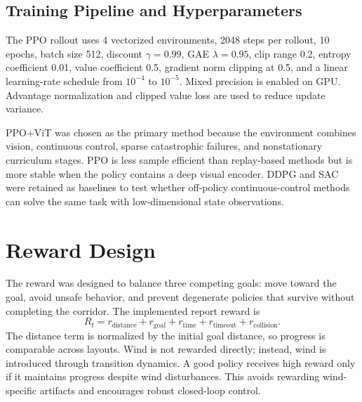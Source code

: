 \documentclass[twocolumn,a4paper,10pt]{article}
\begin{document}
\subsection{Training Pipeline and Hyperparameters}

The PPO rollout uses 4 vectorized environments, 2048 steps per rollout,
10 epochs, batch size 512, discount $\gamma=0.99$, GAE $\lambda=0.95$,
clip range 0.2, entropy coefficient 0.01, value coefficient 0.5, gradient
norm clipping at 0.5, and a linear learning-rate schedule from $10^{-4}$ to
$10^{-5}$.  Mixed precision is enabled on GPU.  Advantage normalization and
clipped value loss are used to reduce update variance.

PPO+ViT was chosen as the primary method because the environment combines
vision, continuous control, sparse catastrophic failures, and nonstationary
curriculum stages.  PPO is less sample efficient than replay-based methods
but is more stable when the policy contains a deep visual encoder.  DDPG and
SAC were retained as baselines to test whether off-policy continuous-control
methods can solve the same task with low-dimensional state observations.

\section{Reward Design}

The reward was designed to balance three competing goals: move toward the
goal, avoid unsafe behavior, and prevent degenerate policies that survive
without completing the corridor.  The implemented report reward is
\[
R_t=r_{\text{distance}}+r_{\text{goal}}+r_{\text{time}}
    +r_{\text{timeout}}+r_{\text{collision}} .
\]
The distance term is normalized by the initial goal distance, so progress is
comparable across layouts.  Wind is not rewarded directly; instead, wind is
introduced through transition dynamics.  A good policy receives high reward
only if it maintains progress despite wind disturbances.  This avoids
rewarding wind-specific artifacts and encourages robust closed-loop control.
\end{document}
